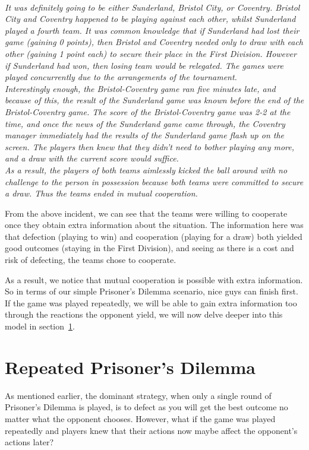 \documentclass{icldt}
\numberwithin{equation}{section}       %
\begin{document}
\begin{center}
\parbox[c]{12cm}{\emph{\\
It was definitely going to be either Sunderland, Bristol City, or Coventry. Bristol City and Coventry happened to be playing against each other, whilst Sunderland played a fourth team. It was common knowledge that if Sunderland had lost their game (gaining 0 points), then Bristol and Coventry needed only to draw with each other (gaining 1 point each) to secure their place in the First Division. However if Sunderland had won, then losing team would be relegated. The games were played concurrently due to the arrangements of the tournament.\\
Interestingly enough, the Bristol-Coventry game ran five minutes late, and because of this, the result of the Sunderland game was known before the end of the Bristol-Coventry game. The score of the Bristol-Coventry game was 2-2 at the time, and once the news of the Sunderland game came through, the Coventry manager immediately had the results of the Sunderland game flash up on the screen. The players then knew that they didn't need to bother playing any more, and a draw with the current score would suffice. \\
As a result, the players of both teams aimlessly kicked the ball around with no challenge to the person in possession because both teams were committed to secure a draw. Thus the teams ended in mutual cooperation.\\}}
\end{center}
From the above incident, we can see that the teams were willing to cooperate once they obtain extra information about the situation. The information here was that defection (playing to win) and cooperation (playing for a draw) both yielded good outcomes (staying in the First Division), and seeing as there is a cost and risk of defecting, the teams chose to cooperate.

As a result, we notice that mutual cooperation is possible with extra information. So in terms of our simple Prisoner's Dilemma scenario, nice guys can finish first. If the game was played repeatedly, we will be able to gain extra information too through the reactions the opponent yield, we will now delve deeper into this model in section~\ref{sect:Repeated Prisoner\'s Dilemma}.
\section{Repeated Prisoner's Dilemma}
\label{sect:Repeated Prisoner\'s Dilemma}
As mentioned earlier, the dominant strategy, when only a single round of Prisoner's Dilemma is played, is to defect as you will get the best outcome no matter what the opponent chooses. However, what if the game was played repeatedly and players knew that their actions now maybe affect the opponent's actions later?
\end{document}
